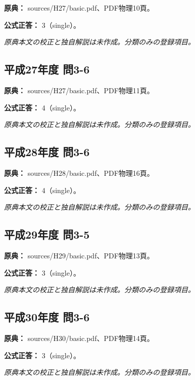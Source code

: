 \noindent\textbf{原典：} sources/H27/basic.pdf、PDF物理10頁。

\textbf{公式正答：} 3（single）。

\par\textit{原典本文の校正と独自解説は未作成。分類のみの登録項目。}

\subsection{平成27年度 問3-6}
\label{q:h27-reg-basic-3-6}

\noindent\textbf{原典：} sources/H27/basic.pdf、PDF物理11頁。

\textbf{公式正答：} 4（single）。

\par\textit{原典本文の校正と独自解説は未作成。分類のみの登録項目。}

\subsection{平成28年度 問3-6}
\label{q:h28-reg-basic-3-6}

\noindent\textbf{原典：} sources/H28/basic.pdf、PDF物理16頁。

\textbf{公式正答：} 4（single）。

\par\textit{原典本文の校正と独自解説は未作成。分類のみの登録項目。}

\subsection{平成29年度 問3-5}
\label{q:h29-reg-basic-3-5}

\noindent\textbf{原典：} sources/H29/basic.pdf、PDF物理13頁。

\textbf{公式正答：} 3（single）。

\par\textit{原典本文の校正と独自解説は未作成。分類のみの登録項目。}

\subsection{平成30年度 問3-6}
\label{q:h30-reg-basic-3-6}

\noindent\textbf{原典：} sources/H30/basic.pdf、PDF物理14頁。

\textbf{公式正答：} 3（single）。

\par\textit{原典本文の校正と独自解説は未作成。分類のみの登録項目。}

